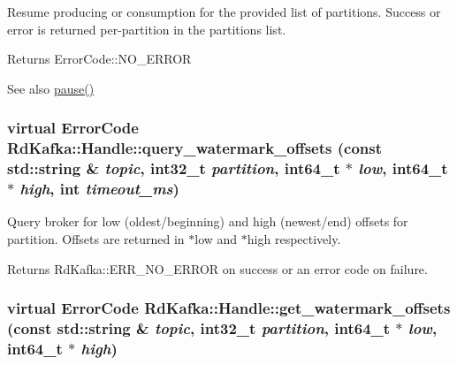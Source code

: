 Resume producing or consumption for the provided list of partitions. Success or error is returned per-\/partition in the {\ttfamily partitions} list.

\begin{DoxyReturn}{Returns}
ErrorCode::NO\_\-ERROR
\end{DoxyReturn}
\begin{DoxySeeAlso}{See also}
\hyperlink{classRdKafka_1_1Handle_a6be6579b7e2a0427b4595fb559e58d0f}{pause()} 
\end{DoxySeeAlso}
\hypertarget{classRdKafka_1_1Handle_aa74da527d73bf7b18ebeda64b3806b15}{
\subsubsection[{query\_\-watermark\_\-offsets}]{\setlength{\rightskip}{0pt plus 5cm}virtual ErrorCode RdKafka::Handle::query\_\-watermark\_\-offsets (const std::string \& {\em topic}, \/  int32\_\-t {\em partition}, \/  int64\_\-t $\ast$ {\em low}, \/  int64\_\-t $\ast$ {\em high}, \/  int {\em timeout\_\-ms})}}
\label{classRdKafka_1_1Handle_aa74da527d73bf7b18ebeda64b3806b15}


Query broker for low (oldest/beginning) and high (newest/end) offsets for partition. Offsets are returned in {\ttfamily $\ast$low} and {\ttfamily $\ast$high} respectively.

\begin{DoxyReturn}{Returns}
RdKafka::ERR\_\-NO\_\-ERROR on success or an error code on failure. 
\end{DoxyReturn}
\hypertarget{classRdKafka_1_1Handle_ab37fddad61506c8749214f1f009d17ca}{
\subsubsection[{get\_\-watermark\_\-offsets}]{\setlength{\rightskip}{0pt plus 5cm}virtual ErrorCode RdKafka::Handle::get\_\-watermark\_\-offsets (const std::string \& {\em topic}, \/  int32\_\-t {\em partition}, \/  int64\_\-t $\ast$ {\em low}, \/  int64\_\-t $\ast$ {\em high})}}
\label{classRdKafka_1_1Handle_ab37fddad61506c8749214f1f009d17ca}



